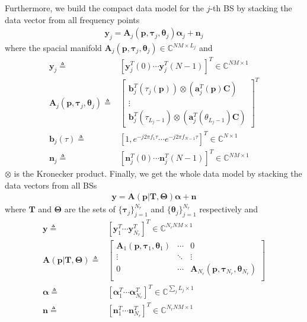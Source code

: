 \documentclass[journal]{IEEEtran}
\begin{document}
Furthermore, we build the compact data model for the $j$-th BS by stacking the data vector from all frequency points
\begin{align}\label{CFR_NM0}
  \boldsymbol{y}_j=\boldsymbol{A}_j(\boldsymbol{p},\boldsymbol{\tau}_j,\boldsymbol{\theta}_j)\boldsymbol{\alpha}_j+\boldsymbol{n}_j
\end{align} 
where the spacial manifold $\boldsymbol{A}_j(\boldsymbol{p},\boldsymbol{\tau}_j,\boldsymbol{\theta}_j)\in \mathbb{C}^{NM\times L_j}$ and
\begin{align}\label{CFR_NM1}
  \boldsymbol{y}_j\triangleq& [\boldsymbol{y}_j^T(0)\cdots \boldsymbol{y}_j^T(N-1)]^T \in \mathbb{C}^{NM \times 1}\\ \nonumber
  \boldsymbol{A}_j(\boldsymbol{p},\boldsymbol{\tau}_j,\boldsymbol{\theta}_j)\triangleq&\left[
  \begin{array}{c}
    \boldsymbol{b}^T_j(\tau_j(\boldsymbol{p}))\otimes (\boldsymbol{a}^T_j(\boldsymbol{p})\boldsymbol{C})\\
    \vdots\\
    \boldsymbol{b}^T_j(\tau_{L_j-1})\otimes (\boldsymbol{a}^T_j(\theta_{L_j-1})\boldsymbol{C})
  \end{array}\right]^T\\ \nonumber
  \boldsymbol{b}_j(\tau)\triangleq& [1,e^{-j2\pi f_1 \tau} \cdots e^{-j2\pi f_{N-1} \tau}]^T\in \mathbb{C}^{N\times 1}\\ \nonumber
  \boldsymbol{n}_j\triangleq& [\boldsymbol{n}_j^T(0)\cdots \boldsymbol{n}_j^T(N-1)]^T\in \mathbb{C}^{NM \times 1}
\end{align}
$\otimes$ is the Kronecker product.
Finally, we get the whole data model by stacking the data vectors from all BSs
\begin{align}\label{CFR_NrNM0}
  \boldsymbol{y}=\boldsymbol{A}(\boldsymbol{p}\vert \mathbf{T},\boldsymbol{\Theta})\boldsymbol{\alpha}+\boldsymbol{n}
\end{align} 
where $\mathbf{T}$ and $\boldsymbol{\Theta}$ are the sets of $\{\boldsymbol{\tau}_j\}_{j=1}^{N_r}$ and $\{\boldsymbol{\theta}_j\}_{j=1}^{N_r}$ respectively and 
\begin{align}\label{CFR_NrNM1}
  \boldsymbol{y}\triangleq& [\boldsymbol{y}_1^T\cdots \boldsymbol{y}_{N_r}^T]^T \in \mathbb{C}^{N_rNM \times 1}\\ \nonumber
  \boldsymbol{A}(\boldsymbol{p}\vert \mathbf{T},\boldsymbol{\Theta})\triangleq&\left[
  \begin{array}{ccc}
    \boldsymbol{A}_1(\boldsymbol{p},\boldsymbol{\tau}_1,\boldsymbol{\theta}_1)&\cdots&0\\
    \vdots &\ddots &\vdots\\
    0&\cdots&\boldsymbol{A}_{N_r}(\boldsymbol{p},\boldsymbol{\tau}_{N_r},\boldsymbol{\theta}_{N_r})\\
  \end{array}\right]\\ \nonumber
  \boldsymbol{\alpha}\triangleq& [\boldsymbol{\alpha}^T_1 \cdots \boldsymbol{\alpha}^T_{N_r}]^T\in \mathbb{C}^{\sum_jL_j\times 1}\\ \nonumber
  \boldsymbol{n}\triangleq& [\boldsymbol{n}_1^T\cdots \boldsymbol{n}_{N_r}^T]^T\in \mathbb{C}^{N_rNM \times 1}
\end{align}
\end{document}
